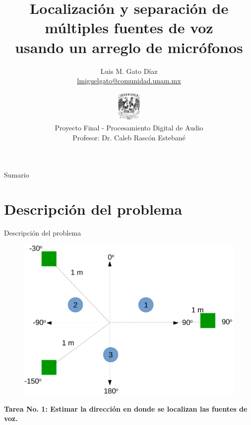 \documentclass[12pt,aspectratio=169]{beamer}
\author[Luis M. Gato Díaz]{\small{Luis M. Gato D\'iaz\\ \href{mailto:lmiguelgato@comunidad.unam.mx}{lmiguelgato@comunidad.unam.mx}}}
\institute[] %
{	
	\tiny{Maestría en Ingeniería Eléctrica,	UNAM}
	
	\tiny{Posgrado de Procesamiento Digital de Señales}
}
\date[\today]
{\includegraphics[height = 15mm]{figures/ingenieriaLOGO}\\
\small{Proyecto Final - Procesamiento Digital de Audio\\Profesor: Dr. Caleb Rascón Estebané}}
\title[Procesamiento Digital de Audio]{Localización y separación de múltiples fuentes de voz \\usando un arreglo de micrófonos}
\begin{document}
	
	\begin{frame}
		\titlepage
	\end{frame}
	
		\LogoOff
	
	\begin{frame}{Sumario}
		\tableofcontents %
	\end{frame}
	

	
	\section{Descripción del problema}
	
	\begin{frame}{Descripción del problema}
		\begin{figure}[h]
			\includegraphics[width=0.55\linewidth]{figures/array1.png}
		\end{figure}
	\hspace{7mm}\textbf{Tarea No. 1: Estimar la dirección en donde se localizan las fuentes de voz.}
	\end{frame}
	
\end{document}
